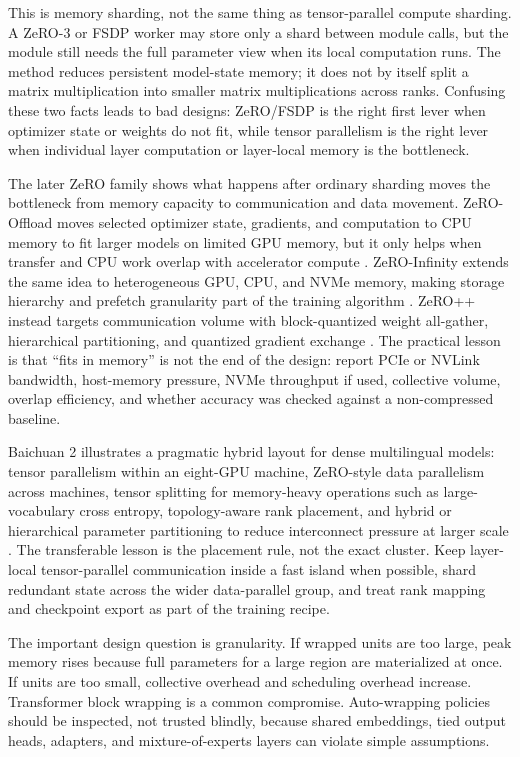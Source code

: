 This is memory sharding, not the same thing as tensor-parallel compute sharding. A ZeRO-3 or FSDP worker may store only a shard between module calls, but the module still needs the full parameter view when its local computation runs. The method reduces persistent model-state memory; it does not by itself split a matrix multiplication into smaller matrix multiplications across ranks. Confusing these two facts leads to bad designs: ZeRO/FSDP is the right first lever when optimizer state or weights do not fit, while tensor parallelism is the right lever when individual layer computation or layer-local memory is the bottleneck.

The later ZeRO family shows what happens after ordinary sharding moves the bottleneck from memory capacity to communication and data movement. ZeRO-Offload moves selected optimizer state, gradients, and computation to CPU memory to fit larger models on limited GPU memory, but it only helps when transfer and CPU work overlap with accelerator compute \cite{ren2021zerooffload}. ZeRO-Infinity extends the same idea to heterogeneous GPU, CPU, and NVMe memory, making storage hierarchy and prefetch granularity part of the training algorithm \cite{rajbhandari2021zeroinfinity}. ZeRO++ instead targets communication volume with block-quantized weight all-gather, hierarchical partitioning, and quantized gradient exchange \cite{wang2023zeropp}. The practical lesson is that ``fits in memory'' is not the end of the design: report PCIe or NVLink bandwidth, host-memory pressure, NVMe throughput if used, collective volume, overlap efficiency, and whether accuracy was checked against a non-compressed baseline.

Baichuan 2 illustrates a pragmatic hybrid layout for dense multilingual models: tensor parallelism within an eight-GPU machine, ZeRO-style data parallelism across machines, tensor splitting for memory-heavy operations such as large-vocabulary cross entropy, topology-aware rank placement, and hybrid or hierarchical parameter partitioning to reduce interconnect pressure at larger scale \cite{yang2023baichuan2}. The transferable lesson is the placement rule, not the exact cluster. Keep layer-local tensor-parallel communication inside a fast island when possible, shard redundant state across the wider data-parallel group, and treat rank mapping and checkpoint export as part of the training recipe.

The important design question is granularity. If wrapped units are too large, peak memory rises because full parameters for a large region are materialized at once. If units are too small, collective overhead and scheduling overhead increase. Transformer block wrapping is a common compromise. Auto-wrapping policies should be inspected, not trusted blindly, because shared embeddings, tied output heads, adapters, and mixture-of-experts layers can violate simple assumptions.

